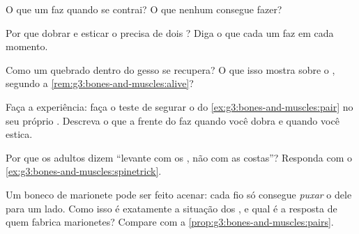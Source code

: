 \begin{exercise}[$\star$]\label{exo:g3:bones-and-muscles:5}
O que um  faz quando se contrai? O que nenhum 
consegue fazer?
\end{exercise}

\begin{exercise}[$\star$]\label{exo:g3:bones-and-muscles:6}
Por que dobrar e esticar o  precisa de dois ? Diga o
que cada um faz em cada momento.
\end{exercise}

\begin{exercise}[$\star$]\label{exo:g3:bones-and-muscles:7}
Como um  quebrado dentro do gesso se recupera? O que isso
mostra sobre o , segundo a \cref{rem:g3:bones-and-muscles:alive}?
\end{exercise}

\begin{exercise}[$\star$]\label{exo:g3:bones-and-muscles:8}
Faça a experiência: faça o teste de segurar o  do
\cref{ex:g3:bones-and-muscles:pair} no seu próprio . Descreva o
que a frente do  faz quando você dobra e quando você estica.
\end{exercise}

\begin{exercise}[$\star\star$]\label{exo:g3:bones-and-muscles:9}
Por que os adultos dizem ``levante com os , não com as
costas''? Responda com o \cref{ex:g3:bones-and-muscles:spinetrick}.
\end{exercise}

\begin{exercise}[$\star\star$]\label{exo:g3:bones-and-muscles:10}
Um boneco de marionete pode ser feito acenar: cada fio só consegue
\emph{puxar} o  dele para um lado. Como isso é exatamente a
situação dos , e qual é a resposta de quem fabrica
marionetes? Compare com a \cref{prop:g3:bones-and-muscles:pairs}.
\end{exercise}
